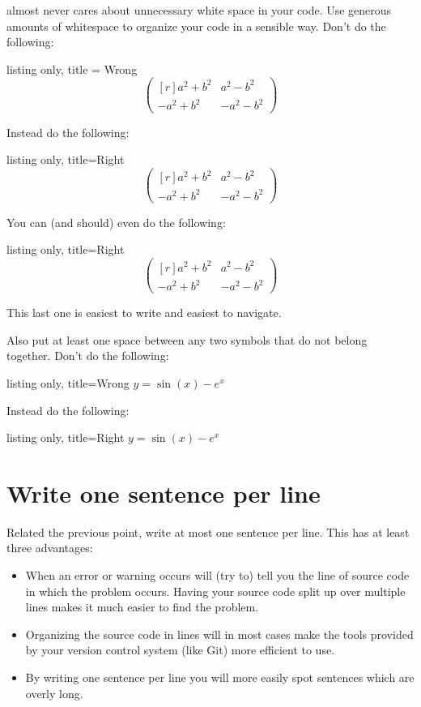  almost never cares about unnecessary white space in your code.
Use generous amounts of whitespace to organize your code in a sensible way.
Don’t do the following:
\begin{tcblisting}{listing only, title = {Wrong}}
\[\begin{pmatrix*}[r]a^2+b^2&a^2-b^2\\-a^2+b^2&-a^2-b^2\end{pmatrix*}\]
\end{tcblisting}
Instead do the following:
\begin{tcblisting}{listing only, title={Right}}
\[
  \begin{pmatrix*}[r]
     a^2 + b^2 &  a^2 - b^2 \\
    -a^2 + b^2 & -a^2 - b^2
  \end{pmatrix*}
\]
\end{tcblisting}
You can (and should) even do the following:
\begin{tcblisting}{listing only, title={Right}}
\[
  \begin{pmatrix*}[r]
    a^2 + b^2
    &
    a^2 - b^2
    \\
    - a^2 + b^2
    &
    - a^2 - b^2
  \end{pmatrix*}
\]
\end{tcblisting}
This last one is easiest to write and easiest to navigate.

Also put at least one space between any two symbols that do not belong together.
Don’t do the following:
\begin{tcblisting}{listing only, title={Wrong}}
$y=\sin(x)-e^x$
\end{tcblisting}
Instead do the following:
\begin{tcblisting}{listing only, title={Right}}
$y = \sin(x) - e^x$
\end{tcblisting}





\section{Write one sentence per line}

Related the previous point, write at most one sentence per line.
This has at least three advantages:
\begin{itemize}
  \item
    When an error or warning occurs  will (try to) tell you the line of source code in which the problem occurs.
    Having your source code split up over multiple lines makes it much easier to find the problem.
  \item
    Organizing the source code in lines will in most cases make the tools provided by your version control system (like Git) more efficient to use.
  \item
    By writing one sentence per line you will more easily spot sentences which are overly long.
\end{itemize}





